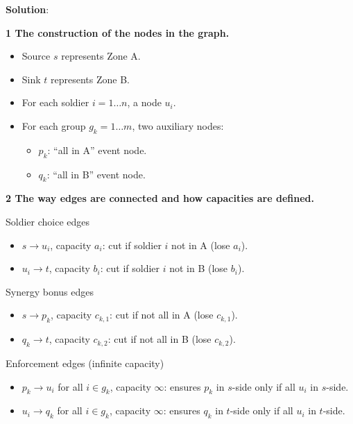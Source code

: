 \newpage
\noindent \textbf{Solution}:

\noindent \textbf{1 The construction of the nodes in the graph.}


\begin{itemize}
    \item Source \( s \) represents Zone A.
    \item Sink \( t \) represents Zone B.
    \item For each soldier \( i= 1\dots n \), a node \( u_i \).
    \item For each group \( g_k = 1\dots m \), two auxiliary nodes:
        \begin{itemize}
            \item \( p_k \): ``all in A'' event node.
            \item \( q_k \): ``all in B'' event node.
        \end{itemize}
\end{itemize}

\noindent \textbf{2 The way edges are connected and how capacities are defined.}

\noindent Soldier choice edges

\begin{itemize}
    \item \( s \to u_i \), capacity \( a_i \): cut if soldier \( i \) not in A (lose \( a_i \)).
    \item \( u_i \to t \), capacity \( b_i \): cut if soldier \( i \) not in B (lose \( b_i \)).
\end{itemize}

\noindent Synergy bonus edges


\begin{itemize}
    \item \( s \to p_k \), capacity \( c_{k,1} \): cut if not all in A (lose \( c_{k,1} \)).
    \item \( q_k \to t \), capacity \( c_{k,2} \): cut if not all in B (lose \( c_{k,2} \)).
\end{itemize}

\noindent Enforcement edges (infinite capacity)

\begin{itemize}
    \item \( p_k \to u_i \) for all \( i \in g_k \), capacity \( \infty \): ensures \( p_k \) in \( s \)-side only if all \( u_i \) in \( s \)-side.
    \item \( u_i \to q_k \) for all \( i \in g_k \), capacity \( \infty \): ensures \( q_k \) in \( t \)-side only if all \( u_i \) in \( t \)-side.
\end{itemize}


